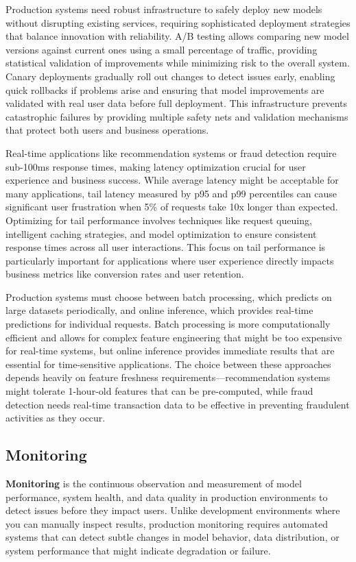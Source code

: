 Production systems need robust infrastructure to safely deploy new models without disrupting existing services, requiring sophisticated deployment strategies that balance innovation with reliability. A/B testing allows comparing new model versions against current ones using a small percentage of traffic, providing statistical validation of improvements while minimizing risk to the overall system. Canary deployments gradually roll out changes to detect issues early, enabling quick rollbacks if problems arise and ensuring that model improvements are validated with real user data before full deployment. This infrastructure prevents catastrophic failures by providing multiple safety nets and validation mechanisms that protect both users and business operations.

Real-time applications like recommendation systems or fraud detection require sub-100ms response times, making latency optimization crucial for user experience and business success. While average latency might be acceptable for many applications, tail latency measured by p95 and p99 percentiles can cause significant user frustration when 5\% of requests take 10x longer than expected. Optimizing for tail performance involves techniques like request queuing, intelligent caching strategies, and model optimization to ensure consistent response times across all user interactions. This focus on tail performance is particularly important for applications where user experience directly impacts business metrics like conversion rates and user retention.

Production systems must choose between batch processing, which predicts on large datasets periodically, and online inference, which provides real-time predictions for individual requests. Batch processing is more computationally efficient and allows for complex feature engineering that might be too expensive for real-time systems, but online inference provides immediate results that are essential for time-sensitive applications. The choice between these approaches depends heavily on feature freshness requirements—recommendation systems might tolerate 1-hour-old features that can be pre-computed, while fraud detection needs real-time transaction data to be effective in preventing fraudulent activities as they occur.

\subsection{Monitoring}

\textbf{Monitoring} is the continuous observation and measurement of model performance, system health, and data quality in production environments to detect issues before they impact users. Unlike development environments where you can manually inspect results, production monitoring requires automated systems that can detect subtle changes in model behavior, data distribution, or system performance that might indicate degradation or failure.

